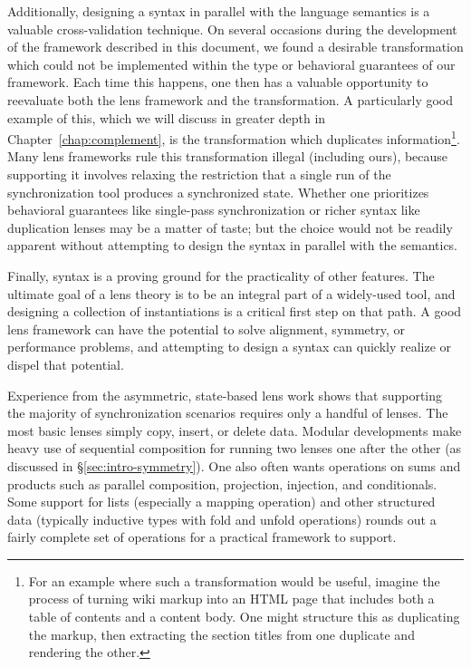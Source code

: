 Additionally, designing a syntax in parallel with the language semantics is
a valuable cross-validation technique. On several occasions during the
development of the framework described in this document, we found a
desirable transformation which could not be implemented within the type or
behavioral guarantees of our framework. Each time this happens, one then has
a valuable opportunity to reevaluate both the lens framework and the
transformation. A particularly good example of this, which we will discuss
in greater depth in Chapter~\ref{chap:complement}, is the transformation
which duplicates information\footnote{For an example where such a
transformation would be useful, imagine the process of turning wiki markup
into an HTML page that includes both a table of contents and a content body.
One might structure this as duplicating the markup, then extracting the
section titles from one duplicate and rendering the other.}. Many lens
frameworks rule this transformation illegal (including ours), because
supporting it involves relaxing the restriction that a single run of the
synchronization tool produces a synchronized state. Whether one prioritizes
behavioral guarantees like single-pass synchronization or richer syntax like
duplication lenses may be a matter of taste; but the choice would not be
readily apparent without attempting to design the syntax in parallel with
the semantics.

Finally, syntax is a proving ground for the practicality of other features.
The ultimate goal of a lens theory is to be an integral part of a
widely-used tool, and designing a collection of instantiations is a critical
first step on that path. A good lens framework can have the potential to
solve alignment, symmetry, or performance problems, and attempting to
design a syntax can quickly realize or dispel that potential.

Experience from the asymmetric, state-based lens work shows that supporting
the majority of synchronization scenarios requires only a handful of lenses.
The most basic lenses simply copy, insert, or delete data. Modular
developments make heavy use of sequential composition for running two lenses
one after the other (as discussed in \S\ref{sec:intro-symmetry}). One also
often wants operations on sums and products such as parallel composition,
projection, injection, and conditionals. Some support for lists (especially
a mapping operation) and other structured data (typically inductive types
with fold and unfold operations) rounds out a fairly complete set of
operations for a practical framework to support.

